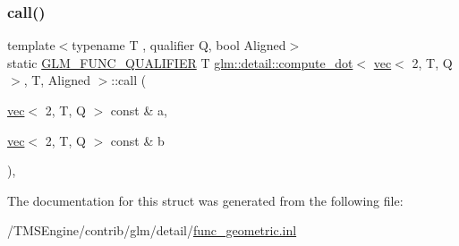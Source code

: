 \subsubsection{\texorpdfstring{call()}{call()}}
{\footnotesize\ttfamily template$<$typename T , qualifier Q, bool Aligned$>$ \\
static \hyperlink{setup_8hpp_a33fdea6f91c5f834105f7415e2a64407}{G\+L\+M\+\_\+\+F\+U\+N\+C\+\_\+\+Q\+U\+A\+L\+I\+F\+I\+ER} T \hyperlink{structglm_1_1detail_1_1compute__dot}{glm\+::detail\+::compute\+\_\+dot}$<$ \hyperlink{structglm_1_1vec}{vec}$<$ 2, T, Q $>$, T, Aligned $>$\+::call (\begin{DoxyParamCaption}\item[{\hyperlink{structglm_1_1vec}{vec}$<$ 2, T, Q $>$ const \&}]{a,  }\item[{\hyperlink{structglm_1_1vec}{vec}$<$ 2, T, Q $>$ const \&}]{b }\end{DoxyParamCaption})\hspace{0.3cm}{\ttfamily [inline]}, {\ttfamily [static]}}



The documentation for this struct was generated from the following file\+:\begin{DoxyCompactItemize}
\item 
/\+T\+M\+S\+Engine/contrib/glm/detail/\hyperlink{func__geometric_8inl}{func\+\_\+geometric.\+inl}\end{DoxyCompactItemize}

